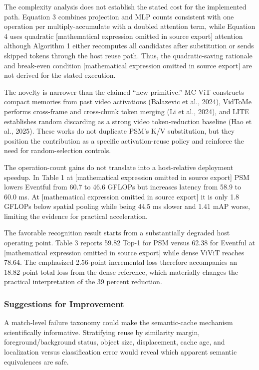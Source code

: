 \documentclass[11pt]{article}
\begin{document}
The complexity analysis does not establish the stated cost for the implemented path. Equation 3 combines projection and MLP counts consistent with one operation per multiply-accumulate with a doubled attention term, while Equation 4 uses quadratic [mathematical expression omitted in source export] attention although Algorithm 1 either recomputes all candidates after substitution or sends skipped tokens through the host reuse path. Thus, the quadratic-saving rationale and break-even condition [mathematical expression omitted in source export] are not derived for the stated execution.

The novelty is narrower than the claimed ``new primitive.'' MC-ViT constructs compact memories from past video activations (Balazevic et al., 2024), VidToMe performs cross-frame and cross-chunk token merging (Li et al., 2024), and LITE establishes random discarding as a strong video token-reduction baseline (Hao et al., 2025). These works do not duplicate PSM's K/V substitution, but they position the contribution as a specific activation-reuse policy and reinforce the need for random-selection controls.

The operation-count gains do not translate into a host-relative deployment speedup. In Table 1 at [mathematical expression omitted in source export]  PSM lowers Eventful from 60.7 to 46.6 GFLOPs but increases latency from 58.9 to 60.0 ms. At [mathematical expression omitted in source export]  it is only 1.8 GFLOPs below spatial pooling while being 44.5 ms slower and 1.41 mAP worse, limiting the evidence for practical acceleration.

The favorable recognition result starts from a substantially degraded host operating point. Table 3 reports 59.82 Top-1 for PSM versus 62.38 for Eventful at [mathematical expression omitted in source export]  while dense ViViT reaches 78.64. The emphasized 2.56-point incremental loss therefore accompanies an 18.82-point total loss from the dense reference, which materially changes the practical interpretation of the 39 percent reduction.

\subsubsection*{Suggestions for Improvement}

A match-level failure taxonomy could make the semantic-cache mechanism scientifically informative. Stratifying reuse by similarity margin, foreground/background status, object size, displacement, cache age, and localization versus classification error would reveal which apparent semantic equivalences are safe.
\end{document}
